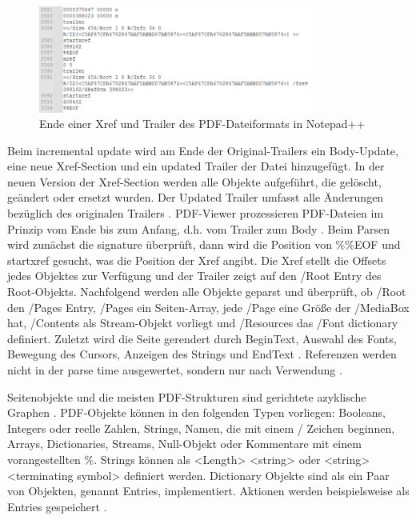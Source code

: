 \begin{figure}[!htb]
	\centering
	\includegraphics[width=0.8\textwidth]{"images/pdf_trailer2-notepad.png"}
	\caption{Ende einer Xref und Trailer des PDF-Dateiformats in Notepad++}
	\label{fig:trailer2}
\end{figure}

Beim incremental update wird am Ende der Original-Trailers ein Body-Update, eine neue Xref-Section und ein updated Trailer der Datei hinzugefügt. In der neuen Version der Xref-Section werden alle Objekte aufgeführt, die gelöscht, geändert oder ersetzt wurden. Der Updated Trailer umfasst alle Änderungen bezüglich des originalen Trailers \cite{schneeberger}. PDF-Viewer prozessieren PDF-Dateien im Prinzip vom Ende bis zum Anfang, d.h. vom Trailer zum Body \cite{ccc-break-pdf}. Beim Parsen wird zunächst die signature überprüft, dann wird die Position von \%\%EOF und startxref gesucht, was die Position der Xref angibt. Die Xref stellt die Offsets jedes Objektes zur Verfügung und der Trailer zeigt auf den /Root Entry des Root-Objekts. Nachfolgend werden alle Objekte geparst und überprüft, ob /Root den /Pages Entry, /Pages ein Seiten-Array, jede /Page eine Größe der /MediaBox hat, /Contents als Stream-Objekt vorliegt und /Resources das /Font dictionary definiert. Zuletzt wird die Seite gerendert durch BeginText, Auswahl des Fonts, Bewegung des Cursors, Anzeigen des Strings und EndText \cite{ccc-pdf-secrets}. Referenzen werden nicht in der parse time ausgewertet, sondern nur nach Verwendung \cite{ccc-wtf-pdf}.
\par
Seitenobjekte und die meisten PDF-Strukturen sind gerichtete azyklische Graphen \cite{ccc-wtf-pdf}. PDF-Objekte können in den folgenden Typen vorliegen: Booleans, Integers oder reelle Zahlen, Strings, Namen, die mit einem / Zeichen beginnen, Arrays, Dictionaries, Streams, Null-Objekt oder Kommentare mit einem vorangestellten \%. Strings können als <Length> <string> oder <string> <terminating symbol> definiert werden. Dictionary Objekte sind als ein Paar von Objekten, genannt Entries, implementiert. Aktionen werden beispielsweise als Entries gespeichert \cite{ccc-badpdf}. \\

